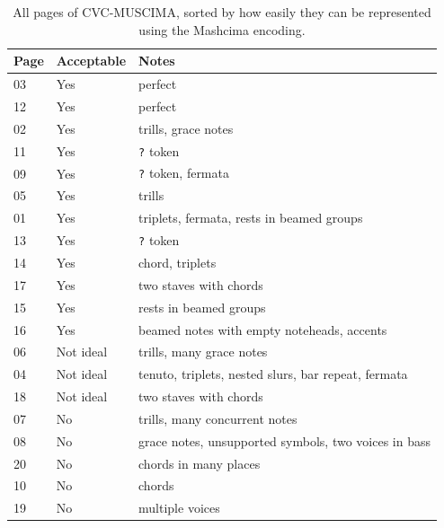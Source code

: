 \begin{table}[h] \centering
\begin{tabular}{lll}
\toprule
\textbf{Page} & \textbf{Acceptable} & \textbf{Notes} \\
\midrule
03 & Yes       & perfect                                              \\
12 & Yes       & perfect                                              \\
02 & Yes       & trills, grace notes                                  \\
11 & Yes       & \verb`?` token                                       \\
09 & Yes       & \verb`?` token, fermata                              \\
05 & Yes       & trills                                               \\
01 & Yes       & triplets, fermata, rests in beamed groups            \\
13 & Yes       & \verb`?` token                                       \\
14 & Yes       & chord, triplets                                      \\
17 & Yes       & two staves with chords                               \\
15 & Yes       & rests in beamed groups                               \\
16 & Yes       & beamed notes with empty noteheads, accents           \\
06 & Not ideal & trills, many grace notes                             \\
04 & Not ideal & tenuto, triplets, nested slurs, bar repeat, fermata  \\
18 & Not ideal & two staves with chords                               \\
07 & No        & trills, many concurrent notes                        \\
08 & No        & grace notes, unsupported symbols, two voices in bass \\
20 & No        & chords in many places                                \\
10 & No        & chords                                               \\
19 & No        & multiple voices                                      \\
\bottomrule
\end{tabular}
\caption{All pages of CVC-MUSCIMA, sorted by how easily they can be represented using the Mashcima encoding.}
\label{tab6:MuscimaPagesByAnnotationEase}
\end{table}

